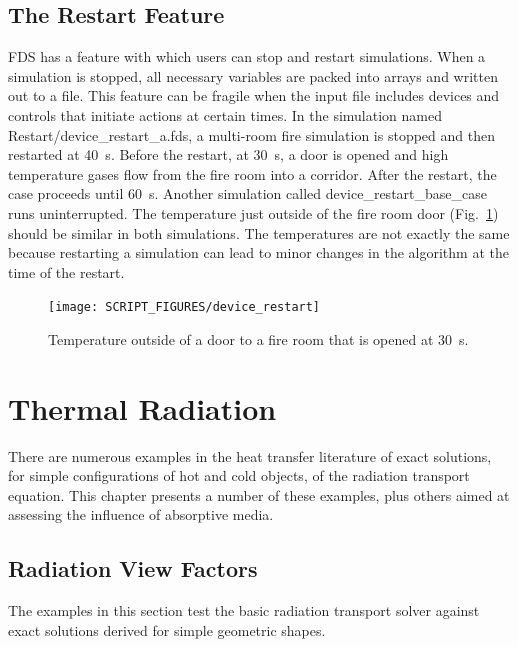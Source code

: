 \documentclass[11pt]{book}
\begin{document}
\newpage

\section{The Restart Feature}
\label{device_restart}
\label{clocks_restart}

FDS has a feature with which users can stop and restart simulations. When a simulation is stopped, all necessary variables are packed into arrays and written out to a file. This feature can be fragile when the input file includes devices and controls that initiate actions at certain times. In the simulation named {\ct Restart/device\_restart\_a.fds}, a multi-room fire simulation is stopped and then restarted at 40~s. Before the restart, at 30~s, a door is opened and high temperature gases flow from the fire room into a corridor. After the restart, the case proceeds until 60~s. Another simulation called {\ct device\_restart\_base\_case} runs uninterrupted. The temperature just outside of the fire room door (Fig.~\ref{device_restart_fig}) should be similar in both simulations. The temperatures are not exactly the same because restarting a simulation can lead to minor changes in the algorithm at the time of the restart.

\begin{figure}[!ht]
\centering
\texttt{[image: SCRIPT\_FIGURES/device\_restart]}
\caption[Result of the  test case]{Temperature outside of a door to a fire room that is opened at 30~s.}
\label{device_restart_fig}
\end{figure}


\chapter{Thermal Radiation}

There are numerous examples in the heat transfer literature of exact solutions, for simple configurations of hot and cold objects, of the radiation transport equation. This chapter presents a number of these examples, plus others aimed at assessing the influence of absorptive media.

\section{Radiation View Factors}

The examples in this section test the basic radiation transport solver against exact solutions derived for simple geometric shapes.
\end{document}
